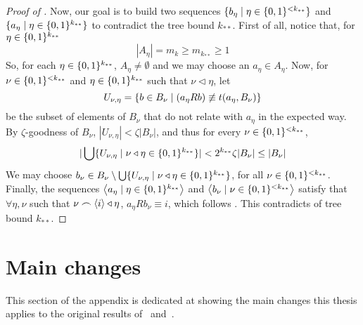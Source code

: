 \begin{proof}[Proof of ]
        Now, our goal is to build two sequences $\{ b_\eta \mid \eta \in \{ 0,1 \}^{<k_{**}} \}$ and
        $\{ a_\eta \mid \eta \in \{ 0,1 \}^{k_{**}} \}$ to contradict the tree bound $k_{**}$.
        First of all, notice that, for $\eta \in \{ 0,1 \}^{k_{**}}$
        \[
            |A_\eta| = m_k \geq m_{k_{**}} \geq 1
        \]
        So, for each $\eta \in \{ 0,1 \}^{k_{**}}$, $A_\eta \neq \emptyset$ and we may choose an $a_\eta \in A_\eta$.
        Now, for $\nu \in \{ 0,1 \}^{<k_{**}}$ and $\eta \in \{ 0,1 \}^{k_{**}}$ such that $\nu \triangleleft \eta$, let
        \[
            U_{\nu,\eta} = \{ b \in B_\nu \mid (a_\eta R b) \not\equiv t(a_\eta, B_\nu) \}
        \]
        be the subset of elements of $B_\nu$ that do not relate with $a_\eta$ in the expected way.
        By $\zeta$-goodness of $B_\nu$, $|U_{\nu, \eta}| < \zeta |B_\nu|$, and thus for every $\nu \in \{ 0,1 \}^{<k_{**}}$,
        \[
            | \bigcup\{  U_{\nu,\eta} \mid \nu \triangleleft \eta \in \{ 0,1 \}^{k_{**}} \} | <
            2^{k_{**}} \zeta |B_\nu| \leq |B_\nu|
        \]
        We may choose $b_\nu \in B_\nu \setminus \bigcup\{ U_{\nu,\eta} \mid \nu \triangleleft \eta \in \{ 0,1 \}^{k_{**}} \}$,
        for all $\nu \in \{ 0,1 \}^{<k_{**}}$.
        Finally, the sequences $\left< a_\eta \mid \eta \in \{ 0,1 \}^{k_{**}} \right>$ and
        $\left< b_\nu \mid \nu \in \{ 0,1 \}^{<k_{**}} \right>$ satisfy that $\forall \eta, \nu$ such that
        $\nu \frown \left< i \right> \triangleleft \eta$, $a_\eta R b_\nu \equiv i$, which follows
        .
        This contradicts  of tree bound $k_{**}$.
    \end{proof}

\vfill\newpage \section{Main changes} \label{sec:main_changes}
    This section of the appendix is dedicated at showing the main changes this thesis applies to the original results
    of~\cite{regularity_lemmas_for_stable_graphs} and~\cite{notes_on_the_stable_regularity_lemma}.

